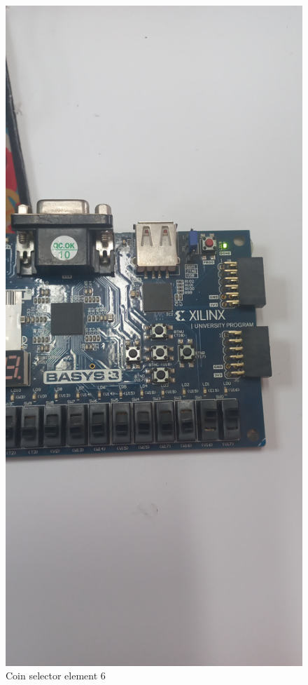\documentclass{article}
\begin{document}
\begin{multicols}{2}
	\begin{figure}[H]
		\centering
		\includegraphics[width=0.8\linewidth]{images/diagrams/coin-selector/coin-selector6.jpg}
		\caption{Coin selector element 6}
		\label{Coin selector element 6 Apendix}
	\end{figure}


\end{multicols}
\end{document}
